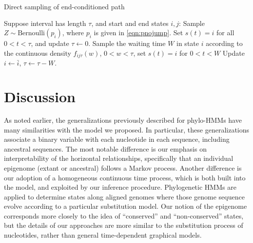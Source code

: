 \documentclass[11pt]{article}
\begin{document}
\begin{algorithm}[t] 
  \begin{algorithmic}[1]
    \caption{Direct sampling of end-conditioned path}\label{alg:samplepath}
    \STATE Suppose interval has length $\tau$, and start and end states $i, j$:
    \STATE Sample $Z\sim \text{Bernoulli}(p_i)$, where
    $p_i$ is given in \eqref{eqn:pnojump}. 
    \STATE Set $s(t) = i$ for all $0 < t < \tau$, and update $\tau \leftarrow 0$. 
    \ENDIF
    \ENDIF
    \STATE Sample the waiting time $W$ in state $i$ according to the continuous
    density $f_{ij\tau}(w)$, $0< w < \tau$, set $s(t) = i$ for $0 < t < W$
    \STATE Update $i \leftarrow \bar{i}$, $\tau \leftarrow \tau - W$.
    \ENDIF
    \ENDWHILE
  \end{algorithmic}
\end{algorithm}


\section{Discussion}

As noted earlier, the generalizations previously described for
phylo-HMMs have many similarities with the model we proposed. In
particular, these generalizations associate a binary variable with
each nucleotide in each sequence, including ancestral sequences.  The
most notable difference is our emphasis on interpretability of the
horizontal relationships, specifically that an individual epigenome
(extant or ancestral) follows a Markov process. Another difference is
our adoption of a homogeneous continuous time process, which is both
built into the model, and exploited by our inference
procedure. Phylogenetic HMMs are applied to determine states along
aligned genomes where those genome sequence evolve according to a
particular substitution model. Our notion of the epigenome corresponds
more closely to the idea of ``conserved'' and ``non-conserved''
states, but the details of our approaches are more similar to the
substitution process of nucleotides, rather than general
time-dependent graphical models.

\clearpage



\end{document}
